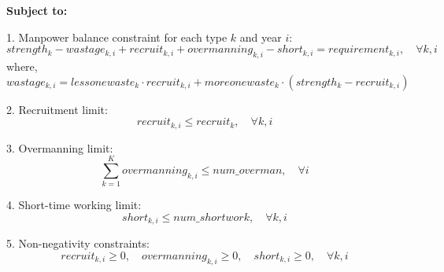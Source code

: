 \documentclass{article}
\begin{document}
\textbf{Subject to:}

1. Manpower balance constraint for each type $k$ and year $i$:
\[
strength_{k} - wastage_{k,i} + recruit_{k,i} + overmanning_{k,i} - short_{k,i} = requirement_{k,i}, \quad \forall k, i
\]
where,
\[
wastage_{k,i} = lessonewaste_{k} \cdot recruit_{k,i} + moreonewaste_{k} \cdot (strength_{k} - recruit_{k,i})
\]

2. Recruitment limit:
\[
recruit_{k,i} \leq recruit_{k}, \quad \forall k, i
\]

3. Overmanning limit:
\[
\sum_{k=1}^{K} overmanning_{k,i} \leq num\_overman, \quad \forall i
\]

4. Short-time working limit:
\[
short_{k,i} \leq num\_shortwork, \quad \forall k, i
\]

5. Non-negativity constraints:
\[
recruit_{k,i} \geq 0, \quad overmanning_{k,i} \geq 0, \quad short_{k,i} \geq 0, \quad \forall k, i
\]
\end{document}
